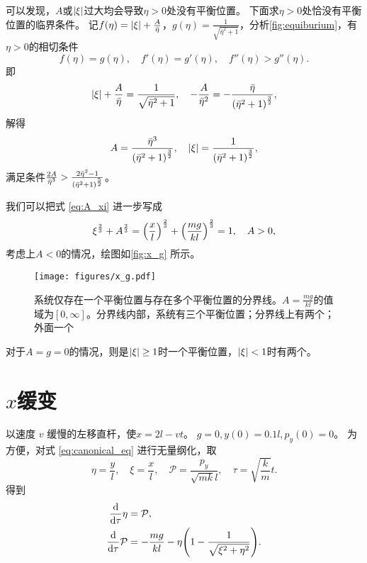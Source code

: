 \documentclass[a4paper,unicode]{report}
\begin{document}
可以发现，$A$或$\qty|\xi|$过大均会导致$\eta>0$处没有平衡位置。
下面求$\eta>0$处恰没有平衡位置的临界条件。
记$f(\eta) = \qty|\xi| + \frac{A}{\bar{\eta}}$，$g(\eta) = \frac{1}{\sqrt{\bar{\eta}^2 + 1}}$，分析\autoref{fig:equiburium}，有$\eta>0$的相切条件
\begin{equation}
    f(\eta) = g(\eta),\quad f'(\eta) = g'(\eta),\quad f''(\eta) > g''(\eta).
\end{equation}
即
\begin{equation}
    \qty|\xi| + \frac{A}{\bar{\eta}} = \frac{1}{\sqrt{\bar{\eta}^2 + 1}},\quad
    -\frac{A}{\bar{\eta}^2} = -\frac{\bar{\eta}}{\qty(\bar{\eta}^2 + 1)^\frac{3}{2}},
\end{equation}
解得
\begin{equation}\label{eq:A_xi}
    A = \frac{\bar{\eta}^3}{\qty(\bar{\eta}^2 + 1)^\frac{3}{2}},\quad
    \qty|\xi| = \frac{1}{\qty(\bar{\eta}^2 + 1)^\frac{3}{2}},
\end{equation}
满足条件$\frac{2A}{\bar{\eta}^3} > \frac{2\bar{\eta}^2 - 1}{\qty(\bar{\eta}^2 + 1)^\frac{5}{2}}$。

我们可以把式 \eqref{eq:A_xi} 进一步写成
\begin{equation}
    \xi^\frac{2}{3} + A^\frac{2}{3}
    = \qty(\frac{x}{l})^\frac{2}{3} + \qty(\frac{mg}{kl})^\frac{2}{3} = 1, \quad A > 0,
\end{equation}
考虑上$A<0$的情况，绘图如\autoref{fig:x_g} 所示。

\begin{figure}
    \centering
    \texttt{[image: figures/x\_g.pdf]}
    \caption{系统仅存在一个平衡位置与存在多个平衡位置的分界线。$A=\frac{mg}{kl}$的值域为$[0,\infty]$。分界线内部，系统有三个平衡位置；分界线上有两个；外面一个}
    \label{fig:x_g}
\end{figure}

对于$A=g=0$的情况，则是$\qty|\xi|\ge 1$时一个平衡位置，$\qty|\xi|<1$时有两个。

\section{\texorpdfstring{$x$}{x}缓变}\label{sec:slow_x}

以速度 $v$ 缓慢的左移直杆，使$x=2l-vt$。
$g=0, y(0) = 0.1l, p_y(0)=0$。
为方便，对式 \eqref{eq:canonical_eq} 进行无量纲化，取
\begin{equation}
    \eta = \frac{y}{l},\quad
    \xi = \frac{x}{l},\quad
    \mathcal{P} = \frac{p_y}{\sqrt{mk}l},\quad
    \tau = \sqrt{\frac{k}{m}}t.
\end{equation}
得到
\begin{subequations}
    \label{eq:dimensionless}
    \begin{align}
        \dv{\tau} \eta &{}= \mathcal{P},\\
        \dv{\tau} \mathcal{P} &{}= -\frac{mg}{kl} - \eta\qty(1-\frac{1}{\sqrt{\xi^2+\eta^2}}).
    \end{align}
\end{subequations}
\end{document}
